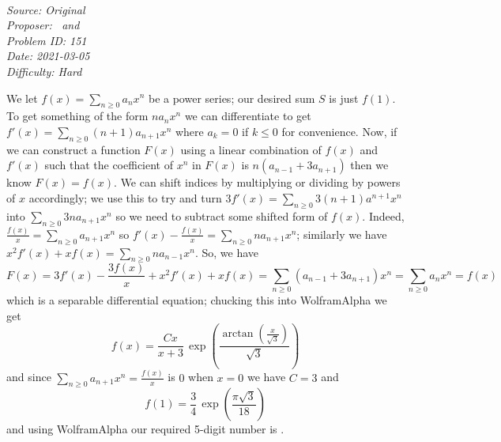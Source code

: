 \SSbreak\\
\emph{Source: Original}\\
\emph{Proposer: \Ptan\, and \Pwen}\\
\emph{Problem ID: 151}\\
\emph{Date: 2021-03-05}\\
\emph{Difficulty: Hard}\\
\SSbreak

\bigskip

\begin{solution}\hfil\medskip
  
    We let $f(x) = \sum_{n \geq 0} a_nx^n$ be a power series; our desired sum $S$ is just $f(1)$. To get something of the form $na_nx^n$ we can differentiate to get
    $f'(x) = \sum_{n \geq 0} (n + 1)a_{n + 1}x^n$ where $a_k = 0$ if $k \leq 0$ for convenience. Now, if we can construct a function $F(x)$ using a linear combination
    of $f(x)$ and $f'(x)$ such that the coefficient of $x^n$ in $F(x)$ is $n\left(a_{n - 1} + 3a_{n + 1}\right)$ then we know $F(x) = f(x)$. 
    We can shift indices by multiplying or dividing by powers of $x$ accordingly; we use this to try and turn $3f'(x) = \sum_{n \geq 0} 3(n + 1)a^{n + 1}x^n$ into 
    $\sum_{n \geq 0} 3na_{n + 1}x^n$ so we need to subtract some shifted form of $f(x)$. Indeed, $\frac{f(x)}{x} = \sum_{n \geq 0} a_{n + 1}x^n$ so 
    $f'(x) - \frac{f(x)}{x} = \sum_{n \geq 0} na_{n + 1}x^n$; similarly we have $x^2f'(x) + xf(x) = \sum_{n \geq 0} na_{n - 1}x^n$. 
    So, we have $$F(x) = 3f'(x) - \frac{3f(x)}{x} + x^2f'(x) + xf(x) = \sum_{n \geq 0}\left(a_{n - 1} + 3a_{n + 1}\right)x^n = \sum_{n \geq 0} a_nx^n = f(x)$$
    which is a separable differential equation; chucking this into WolframAlpha we get $$f(x) = \dfrac{Cx}{x + 3}\,\exp\left(\dfrac{\arctan\left(\frac{x}{\sqrt 3}\right)}{\sqrt 3}\right)$$
    and since $\sum_{n \geq 0} a_{n + 1}x^n = \frac{f(x)}{x}$ is $0$ when $x = 0$ we have $C = 3$ and 
    $$f(1) = \dfrac{3}{4}\, \exp\left(\dfrac{\pi \sqrt 3}{18}\right)$$ and using WolframAlpha our required 5-digit number is .
\end{solution}\bigskip
